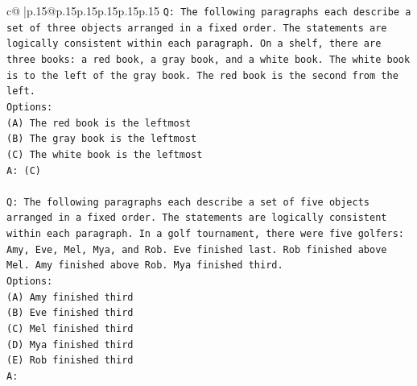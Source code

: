 \documentclass{article}
\begin{document}
{\begin{supertabular}{c@{$\;$}|p{.15\linewidth}@{}p{.15\linewidth}p{.15\linewidth}p{.15\linewidth}p{.15\linewidth}p{.15\linewidth}}
{{{\texttt{Q: The following paragraphs each describe a set of three objects arranged in a fixed order. The statements are logically consistent within each paragraph. On a shelf, there are three books: a red book, a gray book, and a white book. The white book is to the left of the gray book. The red book is the second from the left.} \\
\texttt{Options:} \\
\texttt{(A) The red book is the leftmost} \\
\texttt{(B) The gray book is the leftmost} \\
\texttt{(C) The white book is the leftmost} \\
\texttt{A: (C)} \\
\\ 
\texttt{Q: The following paragraphs each describe a set of five objects arranged in a fixed order. The statements are logically consistent within each paragraph. In a golf tournament, there were five golfers: Amy, Eve, Mel, Mya, and Rob. Eve finished last. Rob finished above Mel. Amy finished above Rob. Mya finished third.} \\
\texttt{Options:} \\
\texttt{(A) Amy finished third} \\
\texttt{(B) Eve finished third} \\
\texttt{(C) Mel finished third} \\
\texttt{(D) Mya finished third} \\
\texttt{(E) Rob finished third} \\
\texttt{A:} \\
            }
        }
    }
     \\ \\


\end{supertabular}}
\end{document}
